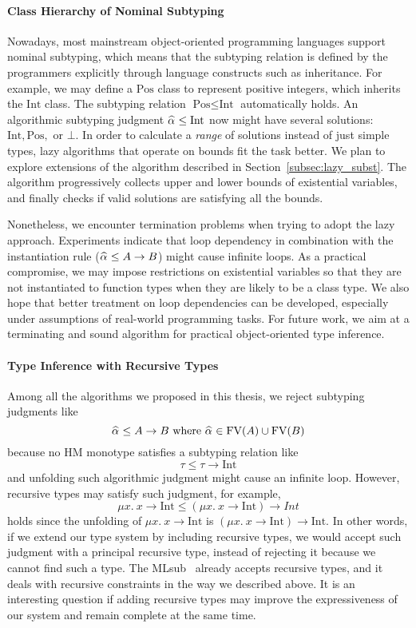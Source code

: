 \paragraph{Class Hierarchy of Nominal Subtyping}
Nowadays, most mainstream object-oriented programming languages
support nominal subtyping,
which means that the subtyping relation is defined by the programmers explicitly
through language constructs such as inheritance.
For example, we may define a $\text{Pos}$ class to represent positive integers,
which inherits the $\text{Int}$ class.
The subtyping relation $\text{Pos} \le \text{Int}$ automatically holds.
An algorithmic subtyping judgment $\al \le \text{Int}$
now might have several solutions: $\text{Int}, \text{Pos},$ or $\bot$.
In order to calculate a \emph{range} of solutions instead of
just simple types,
lazy algorithms that operate on bounds fit the task better.
We plan to explore extensions of the algorithm described in Section~\ref{subsec:lazy_subst}.
The algorithm progressively collects upper and lower bounds of existential variables,
and finally checks if valid solutions are satisfying all the bounds.

Nonetheless, we encounter termination problems when trying to adopt the lazy approach.
Experiments indicate that loop dependency in combination with the
instantiation rule ($\al \le A \to B$) might cause infinite loops.
As a practical compromise,
we may impose restrictions on existential variables
so that they are not instantiated to function types
when they are likely to be a class type.
We also hope that better treatment on loop dependencies can be
developed, especially under assumptions of real-world programming tasks.
For future work,
we aim at a terminating and sound algorithm for practical object-oriented type inference.


\paragraph{Type Inference with Recursive Types}
Among all the algorithms we proposed in this thesis,
we reject subtyping judgments like
$$\al \le A \to B \text{ where } \al \in \text{FV}(A) \cup \text{FV}(B)$$
because no HM monotype satisfies a subtyping relation like
$$\tau \le \tau \to \text{Int}$$
and unfolding such algorithmic judgment might cause an infinite loop.
However, recursive types may satisfy such judgment, for example,
$$\mu x.~x \to \text{Int} \le (\mu x.~x \to \text{Int}) \to Int$$
holds since the unfolding of $\mu x.~x \to \text{Int}$
is $(\mu x.~x \to \text{Int}) \to \text{Int}$.
In other words, if we extend our type system by including recursive types,
we would accept such judgment with a principal recursive type,
instead of rejecting it because we cannot find such a type.
The MLsub~\citep{mlsub} already accepts recursive types,
and it deals with recursive constraints in the way we described above.
It is an interesting question
if adding recursive types may improve the expressiveness
of our system and remain complete at the same time.

